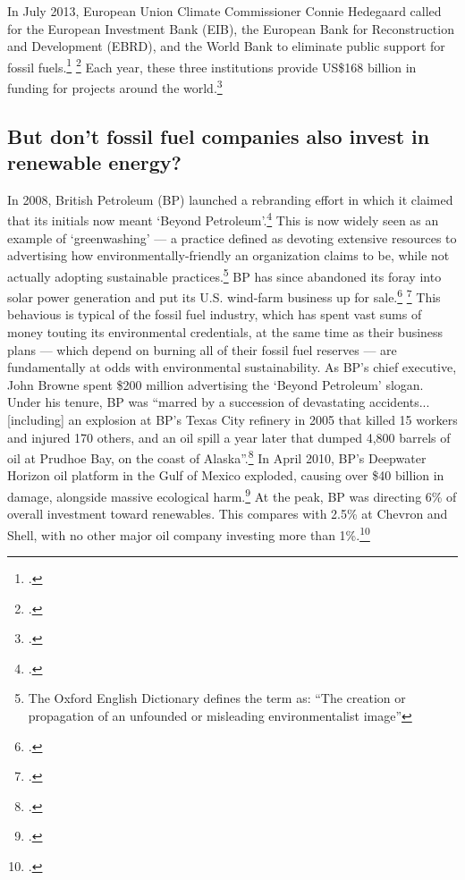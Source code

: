 In July 2013, European Union Climate Commissioner Connie Hedegaard called for the European Investment Bank (EIB), the European Bank for Reconstruction and Development (EBRD), and the World Bank to eliminate public support for fossil fuels.\footcite[][p. 9--10]{InvestHasteRepent} \footcite[See also:][]{HedegaardAppeal}
Each year, these three institutions provide US\$168 billion in funding for projects around the world.\footcite[][p. 10]{InvestHasteRepent}


	
	\subsection{But don't fossil fuel companies also invest in renewable energy?}
	\label{RenewableInvest}



In 2008, British Petroleum (BP) launched a rebranding effort in which it claimed that its initials now meant `Beyond Petroleum'.\footcite[][]{GreenwashBP}
This is now widely seen as an example of `greenwashing' --- a practice defined as devoting extensive resources to advertising how environmentally-friendly an organization claims to be, while not actually adopting sustainable practices.\footnote{The Oxford English Dictionary defines the term as: ``The creation or propagation of an unfounded or misleading environmentalist image''}
BP has since abandoned its foray into solar power generation and put its U.S. wind-farm business up for sale.\footcite[][]{BPNoLongerBeyond} \footcite[][]{BPNoMore}
This behavious is typical of the fossil fuel industry, which has spent vast sums of money touting its environmental credentials, at the same time as their business plans --- which depend on burning all of their fossil fuel reserves --- are fundamentally at odds with environmental sustainability.
As BP's chief executive, John Browne spent \$200 million advertising the `Beyond Petroleum' slogan.
Under his tenure, BP was ``marred by a succession of devastating accidents... [including] an explosion at BP's Texas City refinery in 2005 that killed 15 workers and injured 170 others, and an oil spill a year later that dumped 4,800 barrels of oil at Prudhoe Bay, on the coast of Alaska''.\footcite[][]{BlackStuffBP}
In April 2010, BP's Deepwater Horizon oil platform in the Gulf of Mexico exploded, causing over \$40 billion in damage, alongside massive ecological harm.\footcite[][]{OffshoreLiability}
At the peak, BP was directing 6\% of overall investment toward renewables.
This compares with 2.5\% at Chevron and Shell, with no other major oil company investing more than 1\%.\footcite[][]{RSBigOilLies}




